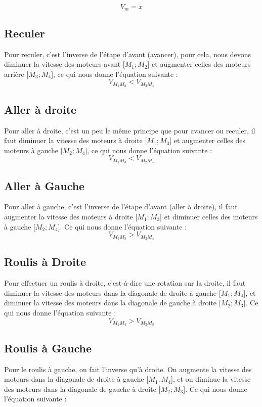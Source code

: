 \documentclass{rapport}
\begin{document}
$$ V_m = x $$



\subsection{Reculer}
Pour reculer, c'est l'inverse de l'étape d'avant (avancer), pour cela, nous devons diminuer la vitesse des moteurs avant [$M_1; M_2$] et augmenter celles des moteurs arrière [$M_3; M_4$], ce qui nous donne l'équation suivante : \\

$$ V_{M_1M_2} < V_{M_3M_4}$$

\subsection{Aller à droite}
Pour aller à droite, c'est un peu le même principe que pour avancer ou reculer, il faut diminuer la vitesse des moteurs à droite [$M_1; M_3$] et augmenter celles des moteurs à gauche [$M_2; M_4$], ce qui nous donne l'équation suivante : \\

$$ V_{M_1M_3} < V_{M_2M_4}$$

\subsection{Aller à Gauche}
Pour aller à gauche, c'est l'inverse de l'étape d'avant (aller à droite), il faut augmenter la vitesse des moteurs à droite [$M_1; M_3$] et diminuer celles des moteurs à gauche [$M_2; M_4$]. Ce qui nous donne l'équation suivante : \\

$$ V_{M_1M_3} > V_{M_2M_4}$$

\subsection{Roulis à Droite}
Pour effectuer un roulis à droite, c'est-à-dire une rotation sur la droite, il faut diminuer la vitesse des moteurs dans la diagonale de droite à gauche [$M_1; M_4$], et diminuer la vitesse des moteurs dans la diagonale de gauche à droite [$M_2; M_3$]. Ce qui nous donne l'équation suivante : \\

$$ V_{M_1M_4} > V_{M_2M_3}$$

\subsection{Roulis à Gauche}
Pour le roulis à gauche, on fait l'inverse qu'à droite. On augmente la vitesse des moteurs dans la diagonale de droite à gauche [$M_1; M_4$], et on diminue la vitesse des moteurs dans la diagonale de gauche à droite [$M_2; M_3$]. Ce qui nous donne l'équation suivante :
\end{document}
